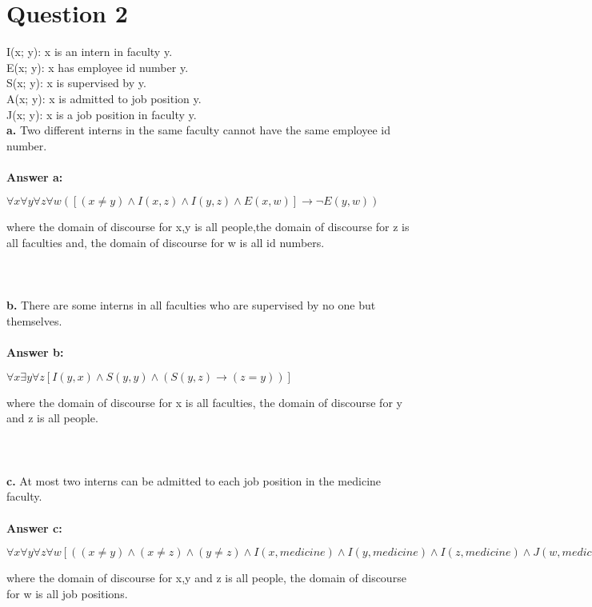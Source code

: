 \documentclass[11pt]{article}
\begin{document}
\newpage
\section*{Question 2}
I(x; y): x is an intern in faculty y.\\
E(x; y): x has employee id number y.\\
S(x; y): x is supervised by y.\\
A(x; y): x is admitted to job position y.\\
J(x; y): x is a job position in faculty y.\\

\noindent
\textbf{a.} Two different interns in the same faculty cannot have the same employee id number.\\\\
\textbf{Answer a:} \\
\begin{center}
    $\forall x \forall y \forall z \forall w ([(x\neq y)\wedge I(x,z) \wedge I(y,z) \wedge E(x,w)] \rightarrow \neg E(y,w))$ \\
\end{center}
where the domain of discourse for x,y is all people,the domain of discourse for z is all faculties and, the domain of discourse for w is all id numbers.
\\\\\\\\
\textbf{b.} There are some interns in all faculties who are supervised by no one but themselves. \\\\
\textbf{Answer b:} \\
\begin{center}
    $\forall x \exists y \forall z [I(y,x) \wedge S(y,y) \wedge (S(y,z) \rightarrow (z=y))]$
\end{center}
where the domain of discourse for x is all faculties, the domain of discourse for y and z is all people.
\\\\\\\\
\textbf{c.} At most two interns can be admitted to each job position in the medicine faculty. \\\\
\textbf{Answer c:} \\
\begin{center}
    $\forall x \forall y \forall z \forall w [((x \neq y) \wedge (x \neq z) \wedge (y \neq z) \wedge I(x,medicine) \wedge I(y,medicine) \wedge
    I(z,medicine) \wedge J(w,medicine) \wedge A(x,w) \wedge A(y,w)) \rightarrow \neg A(z,w)]$
\end{center}
where the domain of discourse for x,y and z is all people, the domain of discourse for w is all job positions.
\end{document}
